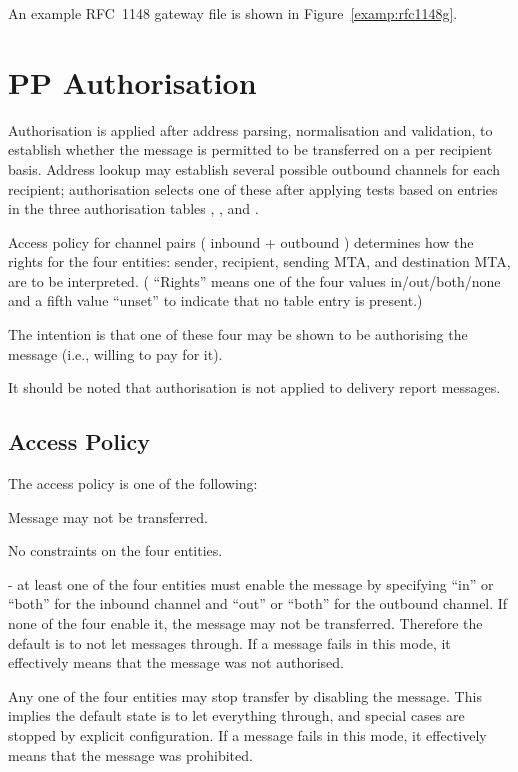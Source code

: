 An example RFC~1148 gateway file is shown in
Figure~\ref{examp:rfc1148g}.


\section{PP Authorisation}\label{sect:auth}

Authorisation is applied after address parsing, normalisation and
validation, to 
establish whether the message is permitted to be transferred on a per
recipient basis.  Address lookup may establish several possible
outbound channels for each recipient; authorisation selects one of
these after applying tests based on entries in the three authorisation
tables , , and .

Access policy for channel pairs ( inbound + outbound ) determines how
the rights for the four entities: sender, recipient, sending MTA, and
destination MTA, are to be interpreted.  ( ``Rights'' means one of the
four values in/out/both/none and a fifth value ``unset'' to indicate
that no table entry is present.)

The intention is that one of these four may be shown to be authorising
the message (i.e., willing to pay for it).

It should be noted that authorisation is not applied to delivery report
messages. 

\subsection{Access Policy}
The access policy is one of the following:
\begin{describe}
\item[\verb|none|:]
Message may not be transferred.

\item[\verb|free|:]
No constraints on the four entities.

\item[\verb|block| ( i.e., ``blockable'' ):]
- at least one of the four entities must enable the
message by specifying ``in'' or ``both'' for the inbound channel and ``out''
or ``both'' for the outbound channel.  If none of the four enable it,
the message may not be transferred. Therefore the
default is to not let messages through.
If a message fails in this mode, it effectively means that the message was
not authorised.

\item[\verb|negative|:]
Any one of the four entities may stop transfer by disabling the
message. This implies the default state is to let everything through,
and special cases are stopped by explicit configuration.
If a message fails in this mode, it effectively means that the message
was prohibited.

\end{describe}

